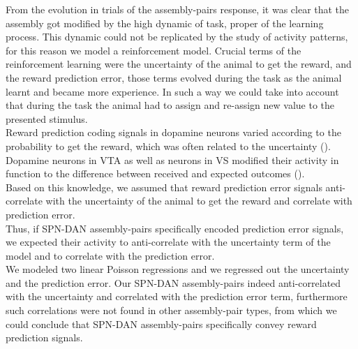 From the evolution in trials of the assembly-pairs response, it was clear that the assembly got modified by the high dynamic of task, proper of the learning process. This dynamic could not be replicated by the study of activity patterns, for this reason we model a reinforcement model. Crucial terms of the reinforcement learning were the uncertainty of the animal to get the reward, and the reward prediction error, those terms evolved during the task as the animal learnt and became more experience. In such a way we could take into account that during the task the animal had to assign and re-assign new value to the presented stimulus.\\Reward prediction coding signals in dopamine neurons varied according to the probability to get the reward, which was often related to the uncertainty (\cite{Schultz1992}). Dopamine neurons in VTA as well as neurons in VS modified their activity in function to the difference between received and expected outcomes (\cite{Fiorillo}).\\Based on this knowledge, we assumed that reward prediction error signals anti-correlate with the uncertainty of the animal to get the reward and correlate with prediction error.\\Thus, if SPN-DAN assembly-pairs specifically encoded prediction error signals, we expected their activity to anti-correlate with the uncertainty term of the model and to correlate with the prediction error.\\We modeled two linear Poisson regressions and we regressed out the uncertainty and the prediction error. Our SPN-DAN assembly-pairs indeed anti-correlated with the uncertainty and correlated with the prediction error term, furthermore such correlations were not found in other assembly-pair types, from which we could conclude that SPN-DAN assembly-pairs specifically convey reward prediction signals.  